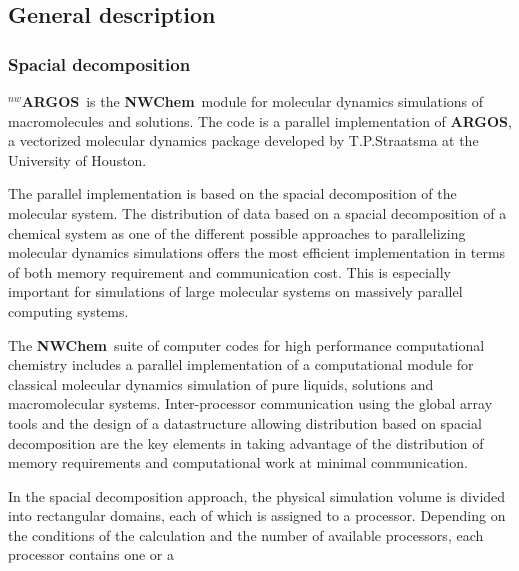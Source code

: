\newcommand{\mc}[3]{\multicolumn{#1}{#2}{#3}}
\newcommand{\vb}[1]{\mbox{\verb.#1.}}
\newcommand{\none}{\multicolumn{2}{|c|}{ }}
\renewcommand{\thetable}{\Roman{table}}
\newcommand{\mcc}[1]{\multicolumn{2}{c}{#1}}
\def\bmu{\mbox{\boldmath $\mu$}}
\def\bE{\mbox{\bf E}}
\def\br{\mbox{\bf r}}
\def\tT{\tilde{T}}
\def\t{\tilde{1}}
\def\ip{i\prime}
\def\jp{j\prime}
\def\ipp{i\prime\prime}
\def\jpp{j\prime\prime}
\def\etal{{\sl et al.}}
\def\nwchem{{\bf NWChem}}
\def\nwargos{{\bf $^{nw}$ARGOS}}
\def\nwtop{{\bf $^{nw}$TOP}}
\def\nwrst{{\bf $^{nw}$RST}}
\def\nwsgm{{\bf $^{nw}$SGM}}
\def\argos{{\bf ARGOS}}
\subsection{General description}
\subsubsection{Spacial decomposition}
\nwargos\  is the \nwchem\  module for molecular dynamics
simulations of macromolecules and solutions. The code is a parallel
implementation of \argos, a vectorized molecular dynamics
package developed by T.P.Straatsma at the University of Houston.
\par
The parallel implementation is based on the spacial decomposition of 
the molecular system.
The distribution of data based on a spacial decomposition of a
chemical system as one of the different possible approaches to
parallelizing molecular dynamics simulations offers the most
efficient implementation in terms of both memory requirement and
communication cost. This is especially important for simulations
of large molecular systems on massively parallel computing systems.
\par
The \nwchem\  suite of computer codes for high performance computational 
chemistry includes a parallel implementation of a computational
module for classical molecular dynamics simulation of pure liquids,
solutions and macromolecular systems.
Inter-processor communication using the global array tools and the
design of a datastructure allowing distribution based on spacial
decomposition are the key elements in taking advantage of
the distribution of memory requirements and computational work at
minimal communication.
\par
In the spacial decomposition approach, the physical simulation
volume is divided into rectangular domains, each of which is
assigned to a processor.
Depending on the conditions of the calculation and the
number of available processors, each processor contains one or a

